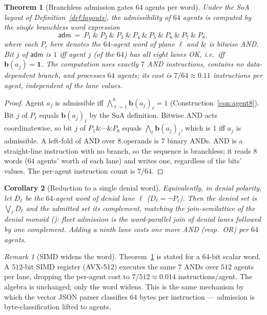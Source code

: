\documentclass[11pt,oneside]{book}
\theoremstyle{definition}
\theoremstyle{plain}
\newtheorem{theorem}{Theorem}[chapter]
\newtheorem{corollary}[theorem]{Corollary}
\theoremstyle{remark}
\newtheorem*{remark}{Remark}
\newcommand{\abyte}{\mathbf{b}}                %
\begin{document}
\begin{theorem}[Branchless admission gates $64$ agents per word]\label{thm:branchless}
Under the SoA layout of Definition~\ref{def:layouts}, the admissibility of $64$ agents is computed
by the single branchless word expression
\[
\mathsf{adm}\ =\ P_1\ \&\ P_2\ \&\ P_3\ \&\ P_4\ \&\ P_5\ \&\ P_6\ \&\ P_7\ \&\ P_8,
\]
where each $P_\ell$ here denotes the $64$-agent word of plane $\ell$ and $\&$ is bitwise AND. Bit
$j$ of $\mathsf{adm}$ is $1$ iff agent $j$ (of the $64$) has all eight lanes OK, i.e.\ iff
$\abyte(a_j)=\mathbf 1$. The computation uses exactly $7$ AND instructions, contains no data-
dependent branch, and processes $64$ agents; its cost is $7/64\approx 0.11$ instructions per
agent, independent of the lane \emph{values}.
\end{theorem}

\begin{proof}
Agent $a_j$ is admissible iff $\bigwedge_{\ell=1}^{8}\abyte(a_j)_\ell=1$
(Construction~\ref{con:agent8}). Bit $j$ of $P_\ell$ equals $\abyte(a_j)_\ell$ by the SoA
definition. Bitwise AND acts coordinatewise, so bit $j$ of $P_1\&\cdots\&P_8$ equals
$\bigwedge_\ell \abyte(a_j)_\ell$, which is $1$ iff $a_j$ is admissible. A left-fold of AND over
$8$ operands is $7$ binary ANDs. AND is a straight-line instruction with no branch, so the
sequence is branchless; it reads $8$ words ($64$ agents' worth of each lane) and writes one,
regardless of the bits' values. The per-agent instruction count is $7/64$.
\end{proof}

\begin{corollary}[Reduction to a single denial word]\label{cor:onedenial}
Equivalently, in denial polarity, let $D_\ell$ be the $64$-agent word of denial lane $\ell$
($D_\ell=\lnot P_\ell$). Then the \emph{denied} set is $\bigvee_\ell D_\ell$ and the admitted set
its complement, matching the join-semilattice of the denial monoid (\cite[Prop.~2.4]{keystone}):
fleet admission is the word-parallel join of denial lanes followed by one complement. Adding a
ninth lane costs one more AND (resp.\ OR) per $64$ agents.
\end{corollary}

\begin{remark}[SIMD widens the word]
Theorem~\ref{thm:branchless} is stated for a $64$-bit scalar word. A $512$-bit SIMD register
(AVX-512) executes the same $7$ ANDs over $512$ agents per lane, dropping the per-agent cost to
$7/512\approx 0.014$ instructions/agent. The algebra is unchanged; only the word widens. This is
the same mechanism by which the vector JSON parser classifies $64$ bytes per instruction
\cite{simdjson} --- admission is byte-classification lifted to agents.
\end{remark}
\end{document}
